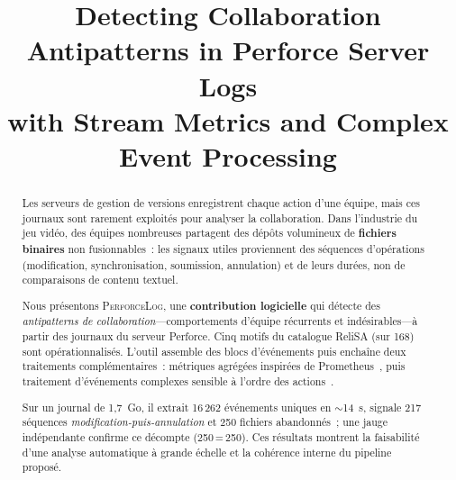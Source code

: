 \documentclass[conference]{IEEEtran}
\newcommand{\toolname}{\textsc{PerforceLog}}
\begin{document}
\title{Detecting Collaboration Antipatterns in Perforce Server Logs\\
with Stream Metrics and Complex Event Processing}

\author{%
\and
{}
\and
{}
}

\maketitle

\begin{abstract}
Les serveurs de gestion de versions enregistrent chaque action d'une
équipe, mais ces journaux sont rarement exploités pour analyser la
collaboration. Dans l'industrie du jeu vidéo, des équipes nombreuses
partagent des dépôts volumineux de \textbf{fichiers binaires} non
fusionnables~: les signaux utiles proviennent des séquences d'opérations
(modification, synchronisation, soumission, annulation) et de leurs
durées, non de comparaisons de contenu textuel.

Nous présentons \toolname{}, une \textbf{contribution logicielle} qui
détecte des \emph{antipatterns de collaboration}---comportements
d'équipe récurrents et indésirables---à partir des journaux du serveur
Perforce. Cinq motifs du catalogue ReliSA (sur 168) sont
opérationnalisés. L'outil assemble des blocs d'événements puis enchaîne
deux traitements complémentaires~: métriques agrégées inspirées de
Prometheus~\cite{brazil2018prometheus,prometheus_metric_types}, puis
traitement d'événements complexes sensible à l'ordre des
actions~\cite{halle2018beepbeep,luckham2002power}.

Sur un journal de 1,7~Go, il extrait 16\,262 événements uniques en
${\sim}$14~s, signale 217 séquences \emph{modification-puis-annulation}
et 250 fichiers abandonnés~; une jauge indépendante confirme ce
décompte (250\,=\,250). Ces résultats montrent la faisabilité d'une
analyse automatique à grande échelle et la cohérence interne du pipeline
proposé.
\end{abstract}
\end{document}
